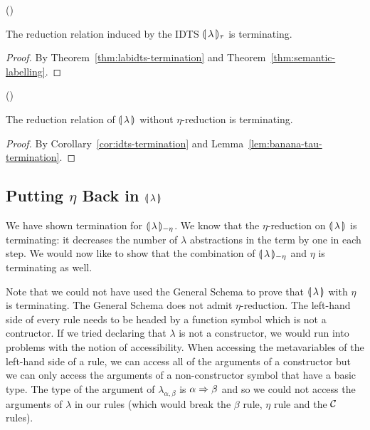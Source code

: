 \begin{corollary}\label{cor:idts-termination}
  ()

  The reduction relation induced by the IDTS ${\llparenthesis \, \lambda \, \rrparenthesis_\tau}$ is terminating.
\end{corollary}

\begin{proof}
  By Theorem~\ref{thm:labidts-termination} and
  Theorem~\ref{thm:semantic-labelling}.
\end{proof}

\begin{corollary}\label{cor:intcalc-termination}
  ()
  
  The reduction relation of $\llparenthesis \, \lambda \, \rrparenthesis$ without $\eta$-reduction is
  terminating.
\end{corollary}

\begin{proof}
  By Corollary~\ref{cor:idts-termination} and
  Lemma~\ref{lem:banana-tau-termination}.
\end{proof}


\subsection{Putting \texorpdfstring{$\eta$}{eta} Back in
  \texorpdfstring{$\llparenthesis \, \lambda \, \rrparenthesis$}{Our Calculus}}
\label{ssec:termination-eta}

We have shown termination for ${\llparenthesis \, \lambda \, \rrparenthesis_{-\eta}}$. We know that the $\eta$-reduction
on ${\llparenthesis \, \lambda \, \rrparenthesis}$ is terminating: it decreases the number of $\lambda$
abstractions in the term by one in each step. We would now like to show
that the combination of ${\llparenthesis \, \lambda \, \rrparenthesis_{-\eta}}$ and $\eta$ is terminating as well.

Note that we could not have used the General Schema to prove that ${\llparenthesis \, \lambda \, \rrparenthesis}$
with $\eta$ is terminating. The General Schema does not admit
$\eta$-reduction. The left-hand side of every rule needs to be headed by a
function symbol which is not a contructor. If we tried declaring that
$\lambda$ is not a constructor, we would run into problems with the notion
of accessibility. When accessing the metavariables of the left-hand side of
a rule, we can access all of the arguments of a constructor but we can only
access the arguments of a non-constructor symbol that have a basic
type. The type of the argument of $\lambda_{\alpha,\beta}$ is
$\alpha \Rightarrow \beta$ and so we could not access the arguments of $\lambda$ in
our rules (which would break the $\beta$ rule, $\eta$ rule and the $\mathcal{C}$
rules).

